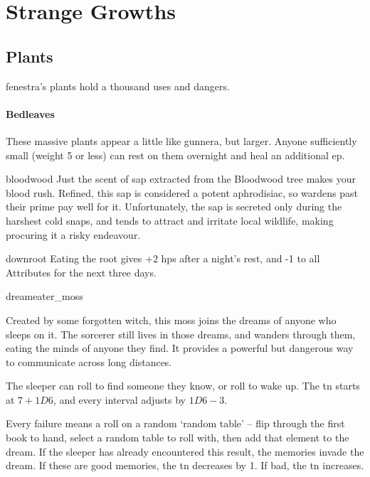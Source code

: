 \chapter{Strange Growths}
\label{growths}

\section{Plants}
\label{plants}

\begin{multicols}{2}
\renewcommand\npcsymbol{\glsentrytext{plant}}

\noindent
\Gls{fenestra}'s plants hold a thousand uses and dangers.

\subsubsection{Bedleaves}
\label{bedleaves}
These massive plants appear a little like gunnera, but larger.
Anyone sufficiently small (\gls{weight} 5 or less) can rest on them overnight and heal an additional \gls{ep}.

%
  {bloodwood}%
  {Just the scent of sap extracted from the Bloodwood tree makes your blood rush.
  Refined, this sap is considered a potent aphrodisiac, so \glspl{warden} past their prime pay well for it.
  Unfortunately, the sap is secreted only during the harshest cold snaps, 
  and tends to attract and irritate local wildlife, making procuring it a risky endeavour.
  }

%
  {downroot}%
  {Eating the root gives +2 \glspl{hp} after a night's rest, and -1 to all Attributes for the next three days.
  }

%
  {dreameater_moss}%
  {
    Created by some forgotten witch, this moss joins the dreams of anyone who sleeps on it.
    The sorcerer still lives in those dreams, and wanders through them, eating the minds of anyone they find.
    It provides a powerful but dangerous way to communicate across long distances.

    The sleeper can roll  to find someone they know, or roll  to wake up.
    The \gls{tn} starts at $7 + 1D6$, and every \gls{interval} adjusts by $1D6 - 3$.

    Every failure means a roll on a random `random table' -- flip through the first book to hand, select a random table to roll with, then add that element to the dream.
    If the sleeper has already encountered this result, the memories invade the dream.
    If these are good memories, the \gls{tn} decreases by 1.
    If bad, the \gls{tn} increases.
  }


\end{multicols}
